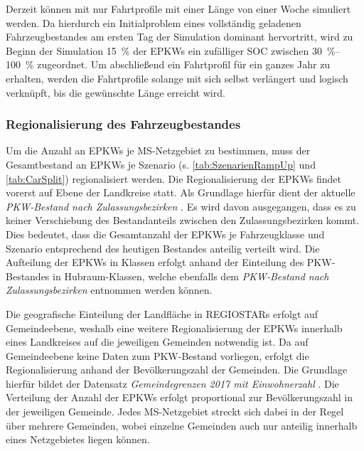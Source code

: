 Derzeit können mit  nur Fahrtprofile mit einer Länge von einer Woche simuliert werden.
Da hierdurch ein Initialproblem eines vollständig geladenen Fahrzeugbestandes am ersten Tag der Simulation dominant hervortritt, wird zu Beginn der Simulation \SI{15}{\percent} der \glspl{EPKW} ein zufälliger \gls{SOC} zwischen \SIrange[range-phrase=~bis~]{30}{100}{\percent} zugeordnet.
Um abschließend ein Fahrtprofil für ein ganzes Jahr zu erhalten, werden die Fahrtprofile solange mit sich selbst verlängert und logisch verknüpft, bis die gewünschte Länge erreicht wird.


\subsubsection{Regionalisierung des Fahrzeugbestandes}

Um die Anzahl an \glspl{EPKW} je \gls{MS}-Netzgebiet zu bestimmen, muss der Gesamtbestand an \glspl{EPKW} je Szenario (s. \autoref{tab:SzenarienRampUp} und \autoref{tab:CarSplit}) regionalisiert werden.
Die Regionalisierung der \glspl{EPKW} findet vorerst auf Ebene der Landkreise statt.
Als Grundlage hierfür dient der aktuelle \textit{PKW-Bestand nach Zulassungsbezirken} \cite[][Stand: ]{KBAPLZ2020}.
Es wird davon ausgegangen, dass es zu keiner Verschiebung des Bestandanteils zwischen den Zulassungsbezirken kommt.
Dies bedeutet, dass die Gesamtanzahl der \glspl{EPKW} je Fahrzeugklasse und Szenario entsprechend des heutigen Bestandes anteilig verteilt wird.
Die Aufteilung der \glspl{EPKW} in Klassen erfolgt anhand der Einteilung des \gls{PKW}-Bestandes in Hubraum-Klassen, welche ebenfalls dem \textit{PKW-Bestand nach Zulassungsbezirken} entnommen werden können.\medskip

Die geo­gra­fische Einteilung der Landfläche in \glspl{REGIOSTAR} erfolgt auf Gemeindeebene, weshalb eine weitere Regionalisierung der \glspl{EPKW} innerhalb eines Landkreises auf die jeweiligen Gemeinden notwendig ist.
Da auf Gemeindeebene keine Daten zum \gls{PKW}-Bestand vorliegen, erfolgt die Regionalisierung anhand der Bevölkerungszahl der Gemeinden.
Die Grundlage hierfür bildet der Datensatz \textit{Gemeindegrenzen 2017 mit Einwohnerzahl} \cite[][Stand: ]{EDG2020}.
Die Verteilung der Anzahl der \glspl{EPKW} erfolgt proportional zur Bevölkerungszahl in der jeweiligen Gemeinde.
Jedes \gls{MS}-Netzgebiet streckt sich dabei in der Regel über mehrere Gemeinden, wobei einzelne Gemeinden auch nur anteilig innerhalb eines Netzgebietes liegen können.\medskip

